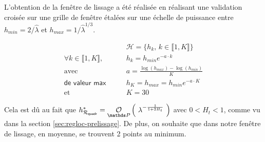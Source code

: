 L'obtention de la fenêtre de lissage a été réalisée en réalisant une validation croisée sur une grille de fenêtre étalées sur une échelle de puissance entre $h_{min} = 2 / \widehat \lambda$ et $h_{max} = 1 / \widehat \lambda^{1/3}$.

\begin{align*}
	                                                 & \mathcal H = \bigl\{ h_k, \, k \in \llbracket 1, K \rrbracket \bigr\}
	\\
	\forall k \in \llbracket 1, K \rrbracket, \qquad & h_k = h_{min} e^{ - a \cdot k }
	\\
	\text{avec } \qquad                              & a = \frac{\log \left( h_{max} \right) - \log(h_{min})}{K}
	\\
	\textsf{de valeur max} \qquad                    & h_K = h_{max} = h_{min} e^{ - a \cdot K }
	\\
	\text{et } \qquad                                & K = 30
\end{align*}

Cela est dû au fait que $h^*_{\mathcal R_{\textsf{quadr}}} = \grandop{ \lambda^{- \frac 1 {1 + 2H_t}} }$ avec $0<H_t<1$, comme vu dans la section \ref{sec:regloc-prelissage}. De plus, on souhaite que dans notre fenêtre de lissage, en moyenne, se trouvent 2 points au minimum. 

